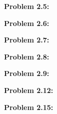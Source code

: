\documentclass[a4paper, 11pt]{article}
\begin{document}
\noindent\textbf{Problem 2.5:}
    
    
    
    
    
\noindent\textbf{Problem 2.6:}
    
    
    
    
    
\noindent\textbf{Problem 2.7:}
    
    
    
    
    
\noindent\textbf{Problem 2.8:}
    
    
    
    
    
\noindent\textbf{Problem 2.9:}
    
    
    
    
    
\noindent\textbf{Problem 2.12:}
    
    
    
    
    
\noindent\textbf{Problem 2.15:}
    
    
    
\end{document}
